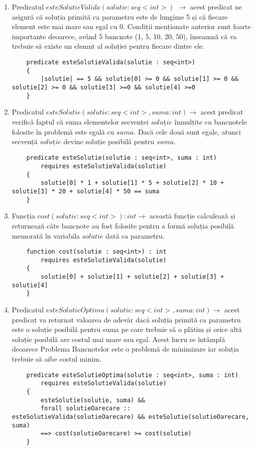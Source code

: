 \par
\begin{enumerate}
	\item Predicatul $esteSolutieValida(solutie : seq<int>)$ $\rightarrow$ acest predicat ne asigură că soluția primită ca parametru este de lungime 5 și că fiecare element este mai mare sau egal cu 0. Condiții menționate anterior sunt foarte importante deoarece, având 5 bancnote (1, 5, 10, 20, 50), înseamnă că va trebuie să existe un elemnt al soluției pentru fiecare dintre ele.
	\par 
\begin{lstlisting}
	predicate esteSolutieValida(solutie : seq<int>)
	{
		|solutie| == 5 && solutie[0] >= 0 && solutie[1] >= 0 && 	solutie[2] >= 0 && solutie[3] >=0 && solutie[4] >=0
	}
\end{lstlisting}
\item Predicatul $esteSolutie(solutie : seq<int>, suma : int) \rightarrow$ acest predicat verifică faptul că suma elementelor secvenței $soluție$ înmulțite cu bancnotele folosite în problemă este egală cu $suma$. Dacă cele două sunt egale, atunci secvență $soluție$ devine soluție posibilă pentru $suma$.
\begin{lstlisting}
	predicate esteSolutie(solutie : seq<int>, suma : int)
		requires esteSolutieValida(solutie)
	{
		solutie[0] * 1 + solutie[1] * 5 + solutie[2] * 10 + solutie[3] * 20 + solutie[4] * 50 == suma
	}
\end{lstlisting}
\vspace{1.5cm}
\item Funcția $cost(solutie : seq<int>) : int \rightarrow$ această funcție calculează și returnează câte bancnote au fost folosite pentru a formă soluția posibilă memorată în variabila $solutie$ dată ca parametru.
\begin{lstlisting}
	function cost(solutie : seq<int>) : int 
		requires esteSolutieValida(solutie)
	{
		solutie[0] + solutie[1] + solutie[2] + solutie[3] + solutie[4]
	}
\end{lstlisting}

\item Predicatul $ esteSolutieOptima(solutie : seq<int>, suma : int) \rightarrow$ acest predicat va returnat valoarea de adevăr dacă soluția primită ca parametru este o soluție posibilă pentru suma pe  care trebuie să o plătim și orice altă soluție posibilă are costul mai mare sau egal. Acest lucru se întâmplă deoarece Problema Bancnotelor este o problemă de minimizare iar soluția trebuie să aibe costul minim.
\begin{lstlisting}
	predicate esteSolutieOptima(solutie : seq<int>, suma : int)
		requires esteSolutieValida(solutie)
	{   
		esteSolutie(solutie, suma) &&
		forall solutieOarecare :: esteSolutieValida(solutieOarecare) && esteSolutie(solutieOarecare, suma) 
		==> cost(solutieOarecare) >= cost(solutie)
	}
\end{lstlisting}


\end{enumerate}
